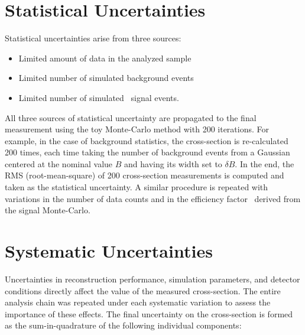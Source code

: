 
\section{Statistical Uncertainties}
Statistical uncertainties arise from three sources:
\begin{itemize}
\item Limited amount of data in the analyzed sample
\item Limited number of simulated background events
\item Limited number of simulated \Wmn\ signal events.
\end{itemize}

All three sources of statistical uncertainty are propagated to the final measurement using the toy Monte-Carlo method with 200 iterations. For example, in the case of background statistics, the cross-section is re-calculated 200 times, each time taking the number of background events from a Gaussian centered at the nominal value $B$ and having its width set to $\delta B$. In the end, the RMS (root-mean-square) of 200 cross-section measurements is computed and taken as the statistical uncertainty. A similar procedure is repeated with variations in the number of data counts and in the efficiency factor \C\ derived from the signal Monte-Carlo.

\section{Systematic Uncertainties}

Uncertainties in reconstruction performance, simulation parameters, and detector conditions directly affect the value of the measured cross-section. The entire analysis chain was repeated under each systematic variation to assess the importance of these effects. The final uncertainty on the cross-section is formed as the sum-in-quadrature of the following individual components:

